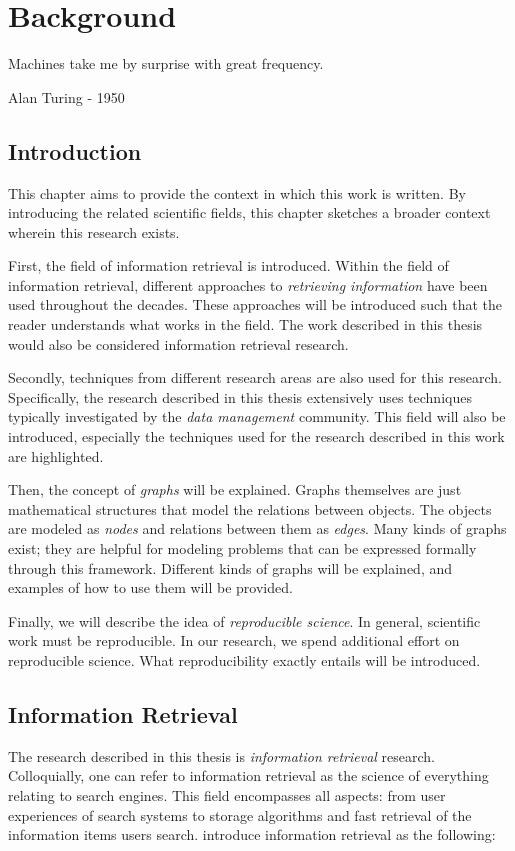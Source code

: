 \chapter{Background}
\label{related-work}

\epigraph{Machines take me by surprise with great frequency.}{Alan Turing - 1950}

\section{Introduction}
This chapter aims to provide the context in which this work is written. By introducing the related scientific fields, this chapter sketches a broader context wherein this research exists. 

First, the field of information retrieval is introduced. Within the field of information retrieval, different approaches to \emph{retrieving information} have been used throughout the decades. These approaches will be introduced such that the reader understands what works in the field. The work described in this thesis would also be considered information retrieval research. 

Secondly, techniques from different research areas are also used for this research. Specifically, the research described in this thesis extensively uses techniques typically investigated by the \emph{data management} community. This field will also be introduced, especially the techniques used for the research described in this work are highlighted. 

Then, the concept of \emph{graphs} will be explained. Graphs themselves are just mathematical structures that model the relations between objects. The objects are modeled as \emph{nodes} and relations between them as \emph{edges}. Many kinds of graphs exist; they are helpful for modeling problems that can be expressed formally through this framework. Different kinds of graphs will be explained, and examples of how to use them will be provided.

Finally, we will describe the idea of \emph{reproducible science}. In general, scientific work must be reproducible. In our research, we spend additional effort on reproducible science. What reproducibility exactly entails will be introduced.  

\section{Information Retrieval}
The research described in this thesis is \emph{information retrieval} research. Colloquially, one can refer to information retrieval as the science of everything relating to search engines. This field encompasses all aspects: from user experiences of search systems to storage algorithms and fast retrieval of the information items users search.  introduce information retrieval as the following:

